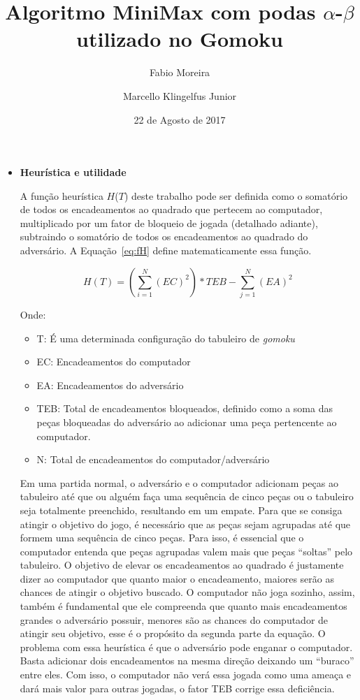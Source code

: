 \documentclass[a4paper,12pt]{article}
\title{Algoritmo MiniMax com podas $\alpha$-$\beta$ utilizado no Gomoku}
\author{Fabio Moreira \and Marcello Klingelfus Junior}
\date{22 de Agosto de 2017}
\begin{document}
\maketitle

\begin{itemize}
 \item \textbf{Heurística e utilidade}
  
 A função heurística $H$($T$) deste trabalho pode ser definida como o somatório de todos os encadeamentos ao 
 quadrado que pertecem ao computador, multiplicado por um fator de bloqueio de jogada (detalhado adiante),
 subtraindo o somatório de todos os encadeamentos ao quadrado do adversário.
 A Equação~\ref{eq:fH} define matematicamente essa função.
 
 \begin{equation}\label{eq:fH}
   H(T) = \left(\sum_{i=1}^{N} (EC)^2\right)*TEB - \sum_{j=1}^{N} (EA)^2
 \end{equation}
 
 Onde:
 \begin{itemize}[label={--}]
  \item T: É uma determinada configuração do tabuleiro de \textit{gomoku}
  \item EC: Encadeamentos do computador
  \item EA: Encadeamentos do adversário
  \item TEB: Total de encadeamentos bloqueados, definido como a soma das peças bloqueadas do adversário ao adicionar uma peça pertencente ao computador.
  \item N: Total de encadeamentos do computador/adversário
 \end{itemize}
 
 Em uma partida normal, o adversário e o computador adicionam peças ao tabuleiro até que ou alguém faça uma sequência
 de cinco peças ou o tabuleiro seja totalmente preenchido, resultando em um empate. Para que se consiga atingir
 o objetivo do jogo, é necessário que as peças sejam agrupadas até que formem uma sequência de cinco peças. Para isso, é essencial
 que o computador entenda que peças agrupadas valem mais que peças ``soltas'' pelo tabuleiro. O objetivo de elevar os encadeamentos ao quadrado
 é justamente dizer ao computador que quanto maior o encadeamento, maiores serão as chances de atingir o objetivo buscado. O computador não joga sozinho, 
 assim, também é fundamental que ele compreenda que quanto mais encadeamentos grandes o adversário possuir, menores são as chances do computador
 de atingir seu objetivo, esse é o propósito da segunda parte da equação.
 O problema com essa heurística é que o adversário pode enganar o computador. Basta adicionar dois encadeamentos na mesma direção deixando um ``buraco'' entre eles.
 Com isso, o computador não verá essa jogada como uma ameaça e dará mais valor para outras jogadas, o fator TEB corrige essa deficiência.


\end{itemize}
\end{document}
